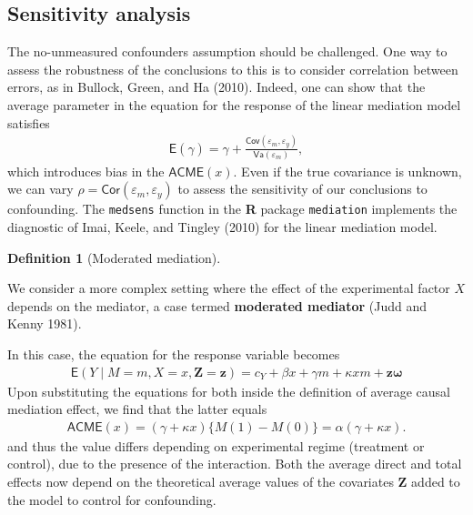 \documentclass[
  11pt,
  letterpaper,
]{scrbook}
\theoremstyle{definition}
\theoremstyle{definition}
\newtheorem{definition}{Definition}[chapter]
\theoremstyle{remark}
\begin{document}
\subsection{Sensitivity analysis}\label{sensitivity-analysis}

The no-unmeasured confounders assumption should be challenged. One way
to assess the robustness of the conclusions to this is to consider
correlation between errors, as in Bullock, Green, and Ha (2010). Indeed,
one can show that the average parameter in the equation for the response
of the linear mediation model satisfies \begin{align*}
\mathsf{E}(\widehat{\gamma})= \gamma + \frac{\mathsf{Cov}(\varepsilon_m, \varepsilon_y)}{\mathsf{Va}(\varepsilon_m)},
\end{align*} which introduces bias in the \(\mathsf{ACME}(x)\). Even if
the true covariance is unknown, we can vary
\(\rho=\mathsf{Cor}(\varepsilon_m, \varepsilon_y)\) to assess the
sensitivity of our conclusions to confounding. The \texttt{medsens}
function in the \textbf{R} package \texttt{mediation} implements the
diagnostic of Imai, Keele, and Tingley (2010) for the linear mediation
model.

\begin{definition}[Moderated
mediation]\protect\hypertarget{def-moderated-mediation}{}\label{def-moderated-mediation}

We consider a more complex setting where the effect of the experimental
factor \(X\) depends on the mediator, a case termed \textbf{moderated
mediator} (Judd and Kenny 1981).

In this case, the equation for the response variable becomes
\begin{align*}
\mathsf{E}(Y \mid M=m, X=x, \boldsymbol{Z} = \boldsymbol{z}) = c_Y + \beta x + \gamma m + \kappa x m + \boldsymbol{z}\boldsymbol{\omega}
\end{align*} Upon substituting the equations for both inside the
definition of average causal mediation effect, we find that the latter
equals \begin{align*}
\mathsf{ACME}(x) = (\gamma + \kappa x)\{M(1)-M(0)\} = \alpha (\gamma + \kappa x).
\end{align*} and thus the value differs depending on experimental regime
(treatment or control), due to the presence of the interaction. Both the
average direct and total effects now depend on the theoretical average
values of the covariates \(\boldsymbol{Z}\) added to the model to
control for confounding.

\end{definition}
\end{document}
